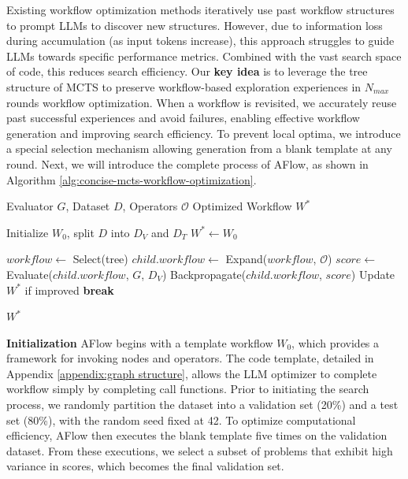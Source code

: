 \documentclass{article} %
\newcommand{\model}{{\sc AFlow}\xspace}
\theoremstyle{plain}
\theoremstyle{definition}
\theoremstyle{remark}
\begin{document}
Existing workflow optimization methods iteratively use past workflow structures to prompt LLMs to discover new structures. However, due to information loss during accumulation (as input tokens increase), this approach struggles to guide LLMs towards specific performance metrics. Combined with the vast search space of code, this reduces search efficiency.
Our \textbf{key idea} is to leverage the tree structure of MCTS to preserve workflow-based exploration experiences in $N_{max}$ rounds workflow optimization. When a workflow is revisited, we accurately reuse past successful experiences and avoid failures, enabling effective workflow generation and improving search efficiency. To prevent local optima, we introduce a special selection mechanism allowing generation from a blank template at any round.
Next, we will introduce the complete process of \model, as shown in Algorithm \ref{alg:concise-mcts-workflow-optimization}.


\begin{algorithm}[!t]
\caption{Algorithm of \model: Detailed implementation}
\label{alg:concise-mcts-workflow-optimization}
\begin{algorithmic}[1]
\Require Evaluator $G$, Dataset $D$, Operators $\mathcal{O}$
\Ensure Optimized Workflow $W^*$

\State Initialize $W_0$, split $D$ into $D_V$ and $D_T$
\State $W^* \gets W_0$

    \State $workflow \gets$ Select(tree) 
    \State $child.workflow \gets$ Expand($workflow$, $\mathcal{O}$) 
    \State $score \gets$ Evaluate($child.workflow$, $G$, $D_V$) 
    \State Backpropagate($child.workflow$, $score$) 
    \State Update $W^*$ if improved
        \textbf{break}
    \EndIf
\EndFor

\State \Return $W^*$
\end{algorithmic}
\end{algorithm}

\textbf{Initialization}
\model begins with a template workflow $W_0$, which provides a framework for invoking nodes and operators. The code template, detailed in Appendix \ref{appendix:graph structure}, allows the LLM optimizer to complete workflow simply by completing call functions. Prior to initiating the search process, we randomly partition the dataset into a validation set (20\%) and a test set (80\%), with the random seed fixed at 42. To optimize computational efficiency, \model then executes the blank template five times on the validation dataset. From these executions, we select a subset of problems that exhibit high variance in scores, which becomes the final validation set.
\end{document}
